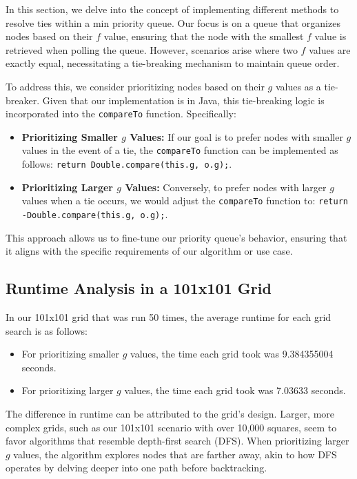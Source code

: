 \documentclass{article}
\begin{document}
In this section, we delve into the concept of implementing different methods to resolve ties within a min priority queue. Our focus is on a queue that organizes nodes based on their $f$ value, ensuring that the node with the smallest $f$ value is retrieved when polling the queue. However, scenarios arise where two $f$ values are exactly equal, necessitating a tie-breaking mechanism to maintain queue order.

To address this, we consider prioritizing nodes based on their $g$ values as a tie-breaker. Given that our implementation is in Java, this tie-breaking logic is incorporated into the \texttt{compareTo} function. Specifically:

\begin{itemize}
    \item \textbf{Prioritizing Smaller $g$ Values:} If our goal is to prefer nodes with smaller $g$ values in the event of a tie, the \texttt{compareTo} function can be implemented as follows: \texttt{return Double.compare(this.g, o.g);}.
    \item \textbf{Prioritizing Larger $g$ Values:} Conversely, to prefer nodes with larger $g$ values when a tie occurs, we would adjust the \texttt{compareTo} function to: \texttt{return -Double.compare(this.g, o.g);}.
\end{itemize}

This approach allows us to fine-tune our priority queue's behavior, ensuring that it aligns with the specific requirements of our algorithm or use case.

\subsection{Runtime Analysis in a 101x101 Grid}
In our 101x101 grid that was run 50 times, the average runtime for each grid search is as follows:
\begin{itemize}
    \item For prioritizing smaller $g$ values, the time each grid took was 9.384355004 seconds.
    \item For prioritizing larger $g$ values, the time each grid took was 7.03633 seconds.
\end{itemize}

The difference in runtime can be attributed to the grid's design. Larger, more complex grids, such as our 101x101 scenario with over 10,000 squares, seem to favor algorithms that resemble depth-first search (DFS). When prioritizing larger $g$ values, the algorithm explores nodes that are farther away, akin to how DFS operates by delving deeper into one path before backtracking.
\end{document}
